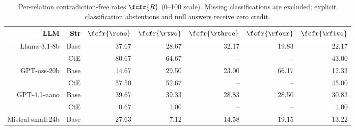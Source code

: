 \begin{table}[!t]
\caption{Per-relation contradiction-free rates $\fcfr{R}$ (0--100 scale). \textcolor{blue!60!black}{Missing} \textcolor{blue!60!black}{classifications} \textcolor{blue!60!black}{are} \textcolor{blue!60!black}{excluded}\textcolor{blue!60!black}{;} \textcolor{blue!60!black}{explicit} \textcolor{blue!60!black}{classification} \textcolor{blue!60!black}{abstentions} \textcolor{blue!60!black}{and} \textcolor{blue!60!black}{null} \textcolor{blue!60!black}{answers} \textcolor{blue!60!black}{receive} \textcolor{blue!60!black}{zero} \textcolor{blue!60!black}{credit}\textcolor{blue!60!black}{.}}
\centering
{}

\footnotesize
\begin{tabular}{r r !{\color{white!80!black} \vline} r r r r r}
\toprule
\textbf{LLM} & \textbf{Str} & $\fcfr{\rone}$ & $\fcfr{\rtwo}$ & $\fcfr{\rthree}$ & $\fcfr{\rfour}$ & $\fcfr{\rfive}$ \\
\midrule
\sf Llama-3.1-8b  & Base & \textcolor{blue!60!black}{37.67} & \textcolor{blue!60!black}{28.67} & \textcolor{blue!60!black}{32.17} & \textcolor{blue!60!black}{19.83} & \textcolor{blue!60!black}{22.17} \\
& CtE & \textcolor{blue!60!black}{80.67} & \textcolor{blue!60!black}{64.67} & \textcolor{blue!60!black}{--} & \textcolor{blue!60!black}{--} & \textcolor{blue!60!black}{43.00} \\ \midrule
\sf GPT-oss-20b  & Base & \textcolor{blue!60!black}{14.67} & \textcolor{blue!60!black}{29.50} & \textcolor{blue!60!black}{23.00} & \textcolor{blue!60!black}{66.17} & \textcolor{blue!60!black}{12.33} \\
& CtE & \textcolor{blue!60!black}{57.50} & \textcolor{blue!60!black}{52.67} & \textcolor{blue!60!black}{--} & \textcolor{blue!60!black}{--} & \textcolor{blue!60!black}{45.00} \\ \midrule
\sf GPT-4.1-nano  & Base & \textcolor{blue!60!black}{39.67} & \textcolor{blue!60!black}{39.33} & \textcolor{blue!60!black}{28.83} & \textcolor{blue!60!black}{28.50} & \textcolor{blue!60!black}{30.83} \\
& CtE & \textcolor{blue!60!black}{0.67} & \textcolor{blue!60!black}{1.00} & \textcolor{blue!60!black}{--} & \textcolor{blue!60!black}{--} & \textcolor{blue!60!black}{1.00} \\ \midrule
\sf Mistral-small:24b  & Base & \textcolor{blue!60!black}{27.63} & \textcolor{blue!60!black}{7.12} & \textcolor{blue!60!black}{14.58} & \textcolor{blue!60!black}{19.15} & \textcolor{blue!60!black}{13.22} \\

\end{tabular}
\end{table}
